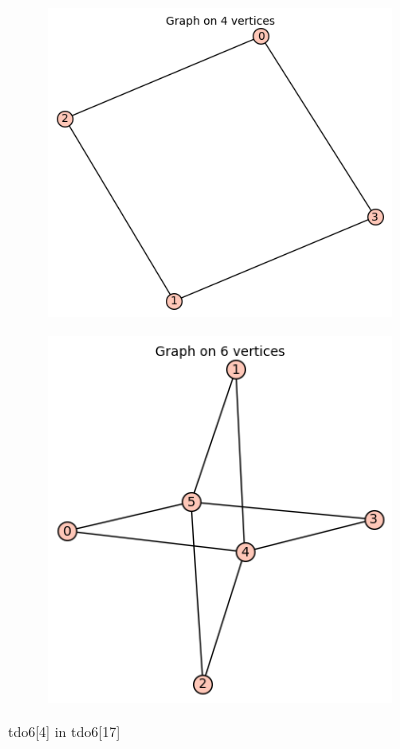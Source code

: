 \documentclass[12pt, a4paper]{article}
\begin{document}
\begin{center}
\begin{figure}[!htb]
\centering
\begin{subfigure}{0.5\textwidth}
  \centering
  \includegraphics[width=0.6\linewidth]{tdo6[4]}
\end{subfigure}%
\begin{subfigure}{0.5\textwidth}
  \centering
  \includegraphics[width=0.6\linewidth]{tdo6[17]}
\end{subfigure}
\caption{tdo6[4] in tdo6[17]}
\label{fig:test}
\end{figure}


\end{center}
\end{document}
